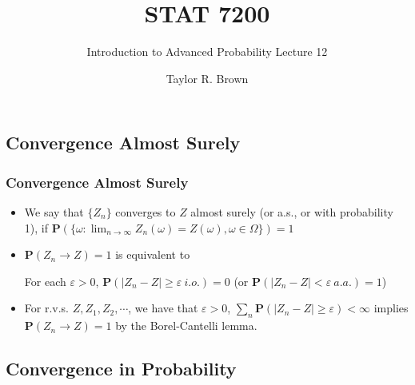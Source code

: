 \documentclass[handout]{beamer}
\title{STAT 7200}
\subtitle{Introduction to Advanced Probability \newline Lecture 12}
\author{Taylor R. Brown}
\institute{}
\date{}
\newcommand{\BP}{\mathbf{P}}
\begin{document}
\frame{\titlepage}

\section[Outline]{}
\frame{\tableofcontents}


\subsection{Convergence Almost Surely}


\frame
{
  \frametitle{Convergence Almost Surely}

   \begin{itemize}
       \item<1-> We say that $\{Z_n\}$ converges to $Z$ almost surely (or a.s., or with probability 1), if $\BP(\{\omega: \lim_{n\rightarrow \infty} Z_n(\omega)= Z(\omega) ,\omega \in \Omega\})=1$ \newline
     
       \item<2->$\BP(Z_n\rightarrow Z)=1$ is equivalent to
       
       For each $\varepsilon>0$, $\BP(|Z_n-Z| \geq \varepsilon \  i.o.)=0$ (or $\BP(|Z_n-Z| < \varepsilon \  a.a.)=1$) \newline
       
       
       \item<3-> For r.v.s. $Z, Z_1, Z_2, \cdots $, we have that $\varepsilon>0$, $\sum_n \BP(|Z_n-Z| \geq \varepsilon)<\infty$ implies $\BP(Z_n\rightarrow Z)=1$ by the Borel-Cantelli lemma.  
                
\end{itemize}
}



\subsection{Convergence in Probability}
\end{document}
